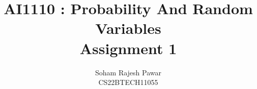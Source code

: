 \documentclass[journal,12pt,twocolumn]{IEEEtran}
\theoremstyle{remark}
\begin{document}
			\title{
				\huge AI1110 : Probability And Random Variables \\ Assignment 1\newline
			}
			\author{\Large Soham Rajesh Pawar\\
			CS22BTECH11055}






\end{document}
